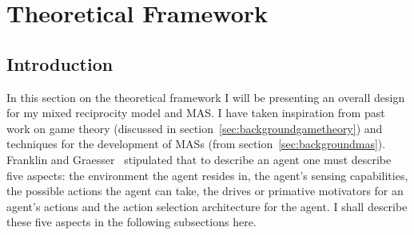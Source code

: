 \documentclass[]{final_report}
\begin{document}
\section{Theoretical Framework}
\label{sec:theo}

\subsection{Introduction}
In this section on the theoretical framework I will be presenting an overall design for my mixed reciprocity model and MAS. I have taken inspiration from past work on game theory (discussed in section~\ref{sec:backgroundgametheory}) and techniques for the development of MASs (from section~\ref{sec:backgroundmas}). Franklin and Graesser~\cite{franklin1996agent} stipulated that to describe an agent one must describe five aspects: the environment the agent resides in, the agent's sensing capabilities, the possible actions the agent can take, the drives or primative motivators for an agent's actions and the action selection architecture for the agent. I shall describe these five aspects in the following subsections here.
\end{document}
